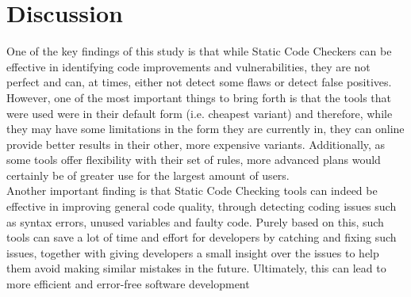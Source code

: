 \documentclass[12pt,a4paper,openany]{book}
\theoremstyle{definition}
\theoremstyle{remark}
\renewcommand*\listtablename{Tables and Figures}
\begin{document}
\renewcommand{\listtablename}{Figures and Tables}
\listoftables

\renewcommand\lstlistlistingname{Code Snippets}
\lstlistoflistings















\chapter{Discussion}\label{cap:discussion}   %

One of the key findings of this study is that while Static Code Checkers can be effective in identifying code improvements and vulnerabilities, they are not perfect and can, at times, either not detect some flaws or detect false positives. However, one of the most important things to bring forth is that the tools that were used were in their default form (i.e. cheapest variant) and therefore, while they may have some limitations in the form they are currently in, they can online provide better results in their other, more expensive variants. Additionally, as some tools offer flexibility with their set of rules, more advanced plans would certainly be of greater use for the largest amount of users. \\

\noindent Another important finding is that Static Code Checking tools can indeed be effective in improving general code quality, through detecting coding issues such as syntax errors, unused variables and faulty code. Purely based on this, such tools can save a lot of time and effort for developers by catching and fixing such issues, together with giving developers a small insight over the issues to help them avoid making similar mistakes in the future. Ultimately, this can lead to more efficient and error-free software development





\clearpage


%
%

\printbibliography
\end{document}
